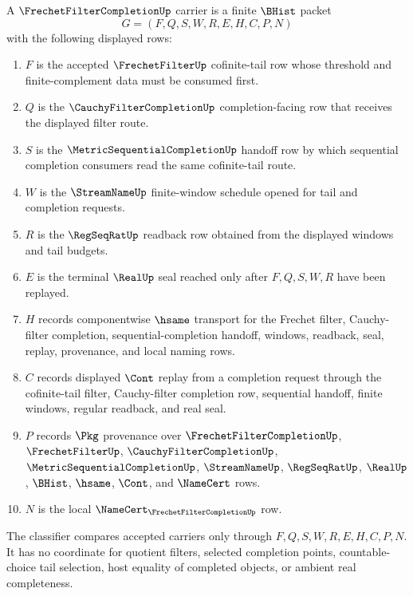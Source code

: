 \begin{definition}
\label{def:frechet-filter-completion-carrier}
A $\FrechetFilterCompletionUp$ carrier is a finite $\BHist$ packet
$$
G=(F,Q,S,W,R,E,H,C,P,N)
$$
with the following displayed rows:
\begin{enumerate}
\item $F$ is the accepted $\FrechetFilterUp$ cofinite-tail row whose threshold and finite-complement data must be consumed first.
\item $Q$ is the $\CauchyFilterCompletionUp$ completion-facing row that receives the displayed filter route.
\item $S$ is the $\MetricSequentialCompletionUp$ handoff row by which sequential completion consumers read the same cofinite-tail route.
\item $W$ is the $\StreamNameUp$ finite-window schedule opened for tail and completion requests.
\item $R$ is the $\RegSeqRatUp$ readback row obtained from the displayed windows and tail budgets.
\item $E$ is the terminal $\RealUp$ seal reached only after $F,Q,S,W,R$ have been replayed.
\item $H$ records componentwise $\hsame$ transport for the Frechet filter, Cauchy-filter completion, sequential-completion handoff, windows, readback, seal, replay, provenance, and local naming rows.
\item $C$ records displayed $\Cont$ replay from a completion request through the cofinite-tail filter, Cauchy-filter completion row, sequential handoff, finite windows, regular readback, and real seal.
\item $P$ records $\Pkg$ provenance over $\FrechetFilterCompletionUp$, $\FrechetFilterUp$, $\CauchyFilterCompletionUp$, $\MetricSequentialCompletionUp$, $\StreamNameUp$, $\RegSeqRatUp$, $\RealUp$, $\BHist$, $\hsame$, $\Cont$, and $\NameCert$ rows.
\item $N$ is the local $\NameCert_{\FrechetFilterCompletionUp}$ row.
\end{enumerate}
The classifier compares accepted carriers only through $F,Q,S,W,R,E,H,C,P,N$. It has no coordinate for quotient filters, selected completion points, countable-choice tail selection, host equality of completed objects, or ambient real completeness.
\end{definition}

